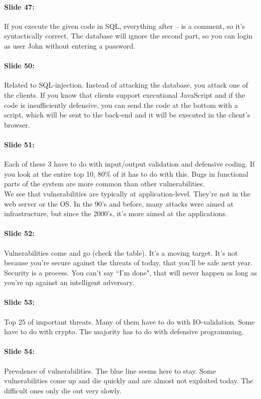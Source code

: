 \documentclass[10pt,a4paper]{report}
\begin{document}
\paragraph{Slide 47:} If you execute the given code in SQL, everything after -- is a comment, so it's syntactically correct. The database will ignore the second part, so you can login as user John without entering a password.

\paragraph{Slide 50:} Related to SQL-injection. Instead of attacking the database, you attack one of the clients. If you know that clients support executional JavaScript and if the code is insufficiently defensive, you can send the code at the bottom with a script, which will be sent to the back-end and it will be executed in the client's browser.

\paragraph{Slide 51:} Each of these 3 have to do with input/output validation and defensive coding. If you look at the entire top 10, 80\% of it has to do with this. Bugs in functional parts of the system are more common than other vulnerabilities.\\
We see that vulnerabilities are typically at application-level. They're not in the web server or the OS. In the 90's and before, many attacks were aimed at infrastructure, but since the 2000's, it's more aimed at the applications.

\paragraph{Slide 52:} Vulnerabilities come and go (check the table). It's a moving target. It's not because you're secure against the threats of today, that you'll be safe next year. Security is a process. You can't say ``I'm done", that will never happen as long as you're up against an intelligent adversary.

\paragraph{Slide 53:} Top 25 of important threats. Many of them have to do with IO-validation. Some have to do with crypto. The majority has to do with defensive programming.

\paragraph{Slide 54:} Prevalence of vulnerabilities. The blue line seems here to stay. Some vulnerabilities come up and die quickly and are almost not exploited today. The difficult ones only die out very slowly.
\end{document}
